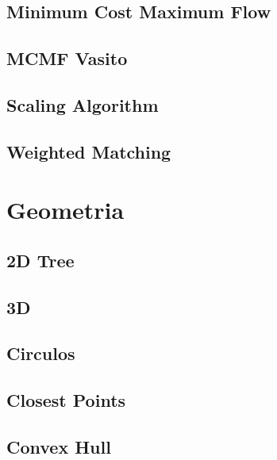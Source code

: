 \subsection{Minimum Cost Maximum Flow}
\raggedbottom
\hrulefill
\subsection{MCMF Vasito}
\raggedbottom
\hrulefill
\subsection{Scaling Algorithm}
\raggedbottom
\hrulefill
\subsection{Weighted Matching}
\raggedbottom
\hrulefill

\section{Geometria}
\subsection{2D Tree}
\raggedbottom
\hrulefill
\subsection{3D}
\raggedbottom
\hrulefill
\subsection{Circulos}
\raggedbottom
\hrulefill
\subsection{Closest Points}
\raggedbottom
\hrulefill
\subsection{Convex Hull}
\raggedbottom
\hrulefill
